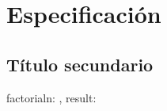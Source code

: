 \documentclass{article}
\begin{document}
	\section{Especificaci\'on}
		\subsection{T\'itulo secundario}
			\begin{proc}{factorial}{\In n: \ent, \Out result: \ent}{}
			\end{proc}
\end{document}
